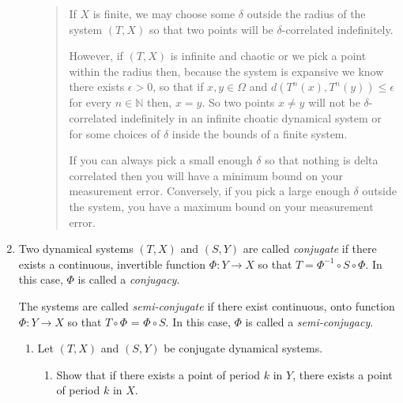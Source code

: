 \documentclass[letter]{article}
\newcommand{\N}{\mathbb{N}}
\begin{document}
\begin{enumerate}
\begin{enumerate}
\begin{quote}
			    If $X$ is finite, we may choose some $\delta$ outside the radius of the system $(T,X)$ so that two points will be  $\delta$-correlated indefinitely.
			    
    		    However, if $(T,X)$ is infinite and chaotic or we pick a point within the radius then, because the system is expansive we know there exists $\epsilon>0$, so that if $x,y \in \Omega$ and $d(T^n(x),T^n(y)) \leq \epsilon$ for every $n \in \N$ then, $x=y$. So two points $x \neq y$ will not be $\delta$-correlated indefinitely in an infinite choatic dynamical system or for some choices of $\delta$ inside the bounds of a finite system.
    		    
    		    If you can always pick a small enough $\delta$ so that nothing is delta correlated then you will have a minimum bound on your measurement error. Conversely, if you pick a large enough $\delta$ outside the system, you have a maximum bound on your measurement error.
			    
			    
			\end{quote}
		\end{enumerate}

    \newpage
	\item Two dynamical systems $(T, X)$ and $(S,Y)$ are called \emph{conjugate} if there exists a continuous, invertible
		function $\Phi:Y\to X$ so that $T=\Phi^{-1}\circ S\circ \Phi$. In this case, $\Phi$ is called a \emph{conjugacy}.

		The systems are called \emph{semi-conjugate} if there
			exist continuous, onto function $\Phi:Y\to X$ so that
			$T\circ\Phi$ = $\Phi\circ S$. In this case, $\Phi$ is called a \emph{semi-conjugacy}.


		\begin{enumerate}
			\item Let $(T,X)$ and $(S,Y)$ be conjugate dynamical systems.
				\begin{enumerate}
					\item Show that if there exists a point of period $k$ in $Y$, there exists a point
						of period $k$ in $X$.
						

\end{enumerate}
\end{enumerate}
\end{enumerate}
\end{document}
